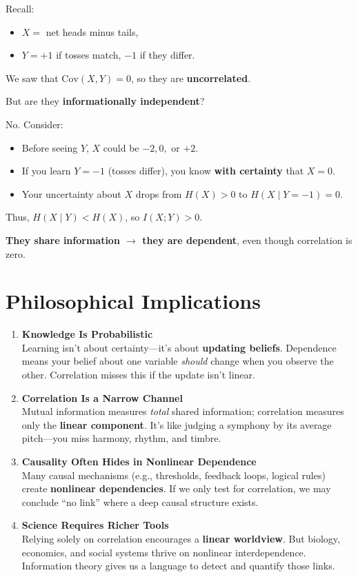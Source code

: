 \documentclass{article}
\begin{document}
Recall:
\begin{itemize}
\item \(X =\) net heads minus tails,
    \item \(Y = +1\) if tosses match, \(-1\) if they differ.
\end{itemize}

We saw that \(\mathrm{Cov}(X, Y) = 0\), so they are \textbf{uncorrelated}.

But are they \textbf{informationally independent}?

No. Consider:
\begin{itemize}
\item Before seeing \(Y\), \(X\) could be \(-2, 0,\) or \(+2\).
    \item If you learn \(Y = -1\) (tosses differ), you know \textbf{with certainty} that \(X = 0\).
    \item Your uncertainty about \(X\) drops from \(H(X) > 0\) to \(H(X \mid Y = -1) = 0\).
\end{itemize}

Thus, \(H(X \mid Y) < H(X)\), so \(I(X; Y) > 0\).

\begin{center}
    \textbf{They share information \(\rightarrow\) they are dependent}, even though correlation is zero.
\end{center}

\section*{Philosophical Implications}

\begin{enumerate}
    \item \textbf{Knowledge Is Probabilistic} \\
    Learning isn’t about certainty—it’s about \textbf{updating beliefs}. Dependence means your belief about one variable \textit{should} change when you observe the other. Correlation misses this if the update isn’t linear.

    \item \textbf{Correlation Is a Narrow Channel} \\
    Mutual information measures \textit{total} shared information; correlation measures only the \textbf{linear component}. It’s like judging a symphony by its average pitch—you miss harmony, rhythm, and timbre.

    \item \textbf{Causality Often Hides in Nonlinear Dependence} \\
    Many causal mechanisms (e.g., thresholds, feedback loops, logical rules) create \textbf{nonlinear dependencies}. If we only test for correlation, we may conclude ``no link'' where a deep causal structure exists.

    \item \textbf{Science Requires Richer Tools} \\
    Relying solely on correlation encourages a \textbf{linear worldview}. But biology, economics, and social systems thrive on nonlinear interdependence. Information theory gives us a language to detect and quantify those links.
\end{enumerate}
\end{document}
